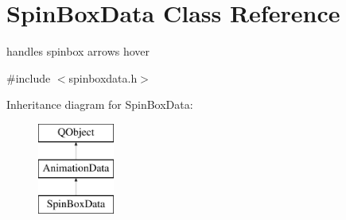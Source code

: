 \hypertarget{class_spin_box_data}{}\section{Spin\+Box\+Data Class Reference}
\label{class_spin_box_data}


handles spinbox arrows hover  




{\ttfamily \#include $<$spinboxdata.\+h$>$}

Inheritance diagram for Spin\+Box\+Data\+:\begin{figure}[H]
\begin{center}
\leavevmode
\includegraphics[height=3.000000cm]{class_spin_box_data}
\end{center}
\end{figure}

